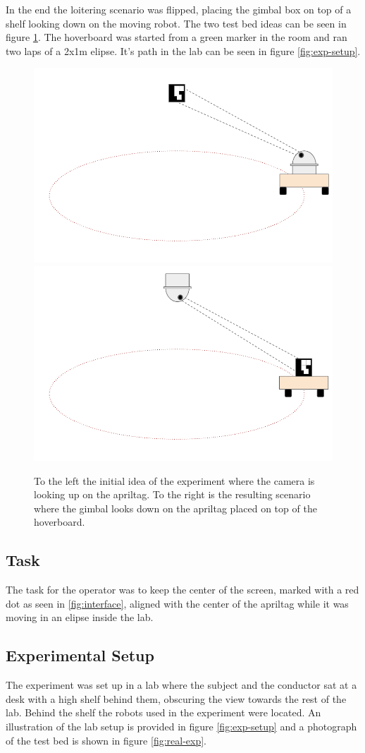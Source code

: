 \documentclass[nofilelist]{cslthse-msc}
\begin{document}
In the end the loitering scenario was flipped, placing the gimbal box on top of a shelf looking down on the moving robot. The two test bed ideas can be seen in figure \ref{fig:testbed-ideas}. The hoverboard was started from a green marker in the room and ran two laps of a 2x1m elipse. It's path in the lab can be seen in figure \ref{fig:exp-setup}.

\begin{figure}[htp]
   \centering
   \includegraphics[width=.47\textwidth]{images/testbed1.png}\hfill
   \includegraphics[width=.47\textwidth]{images/testbed2.png}
   \caption{To the left the initial idea of the experiment where the camera is looking up on the apriltag. To the right is the resulting scenario where the gimbal looks down on the apriltag placed on top of the hoverboard.}
   \label{fig:testbed-ideas}
\end{figure}

\subsection{Task}
The task for the operator was to keep the center of the screen, marked with a red dot as seen in \ref{fig:interface}, aligned with the center of the apriltag while it was moving in an elipse inside the lab.

\subsection{Experimental Setup}
The experiment was set up in a lab where the subject and the conductor sat at a desk with a high shelf behind them, obscuring the view towards the rest of the lab. Behind the shelf the robots used in the experiment were located. An illustration of the lab setup is provided in figure \ref{fig:exp-setup} and a photograph of the test bed is shown in figure \ref{fig:real-exp}.
\end{document}

